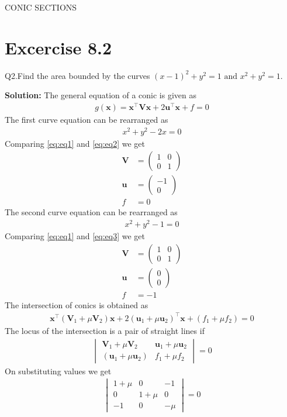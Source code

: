 \documentclass[12pt]{article}
\newcommand{\mydet}[1]{\ensuremath{\begin{vmatrix}#1\end{vmatrix}}}
\providecommand{\brak}[1]{\ensuremath{\left(#1\right)}}
\newcommand{\solution}{\noindent \textbf{Solution: }}
\newcommand{\myvec}[1]{\ensuremath{\begin{pmatrix}#1\end{pmatrix}}}
\let\vec\mathbf
\begin{document}
\begin{center}
\textbf\large{CONIC SECTIONS}

\end{center}
\section*{Excercise 8.2}
Q2.Find the area bounded by the curves $\brak{x-1}^2 + y^2 = 1 \text{ and } x^2+y^2=1$.

\solution
The general equation of a conic is given as
\begin{align}
	\label{eq:eq1}
	g\brak{\vec{x}} = \vec{x}^\top \vec{V}\vec{x}+2\vec{u}^\top \vec{x}+f=0
\end{align}
The first curve equation can be rearranged as
\begin{align}
	\label{eq:eq2}
	x^2+y^2-2x=0
\end{align}
Comparing \eqref{eq:eq1} and \eqref{eq:eq2} we get
\begin{align}
	\vec{V} &= \myvec{1&0\\0&1}\\
	\vec{u} &= \myvec{-1\\0}\\
	f &= 0
\end{align}
The second curve equation can be rearranged as
\begin{align}
	\label{eq:eq3}
	x^2+y^2-1=0
\end{align}
Comparing \eqref{eq:eq1} and \eqref{eq:eq3} we get
\begin{align}
	\vec{V} &= \myvec{1&0\\0&1}\\
	\vec{u} &= \myvec{0\\0}\\
	f &= -1
\end{align}
The intersection of conics is obtained as
\begin{align}
	\vec{x}^\top\brak{\vec{V}_1+\mu\vec{V}_2}\vec{x}+2\brak{\vec{u}_1+\mu\vec{u}_2}^\top\vec{x}+\brak{f_1+\mu f_2}=0
\end{align}
The locus of the intersection is a pair of straight lines if
\begin{align}
	\mydet{\vec{V}_1+\mu\vec{V}_2 & \vec{u}_1+\mu\vec{u}_2 \\ \brak{\vec{u}_1+\mu\vec{u}_2} & f_1+\mu f_2} = 0
\end{align}
On substituting values we get
\begin{align}
	\mydet{1+\mu & 0 & -1 \\ 0 & 1+\mu & 0 \\ -1 & 0 & -\mu} = 0
\end{align}
\end{document}
